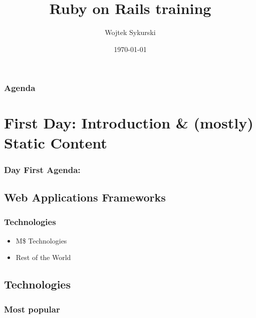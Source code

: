 \documentclass{beamer}
\title{Ruby on Rails training}
\author{Wojtek Sykurski}
\institute[Samsung R\&D]
{
  Samsung R\&D Poland \\
  \medskip
  \textit{w.sykurski@samsung.com}
}
\date{\today}
\theoremstyle{mystyle}
\begin{document}

\begin{frame}
  \titlepage 
\end{frame}

\begin{frame}
  \frametitle{Agenda}
  \tableofcontents[hideallsubsections]
\end{frame}

\section{First Day: Introduction \& (mostly) Static Content}
\begin{frame}
  \frametitle{Day First Agenda:}
  \tableofcontents
  [
  currentsection,
  sectionstyle=hide/hide,
  subsectionstyle=show/show/hide
  ]
\end{frame}

\subsection{Web Applications Frameworks}

\begin{frame}
  \frametitle{Technologies}
  \begin{itemize}
    \item M\$ Technologies
    \item Rest of the World
  \end{itemize}
  
\end{frame}

\subsection{Technologies}

    \subsubsection{Most popular}
\end{document}
